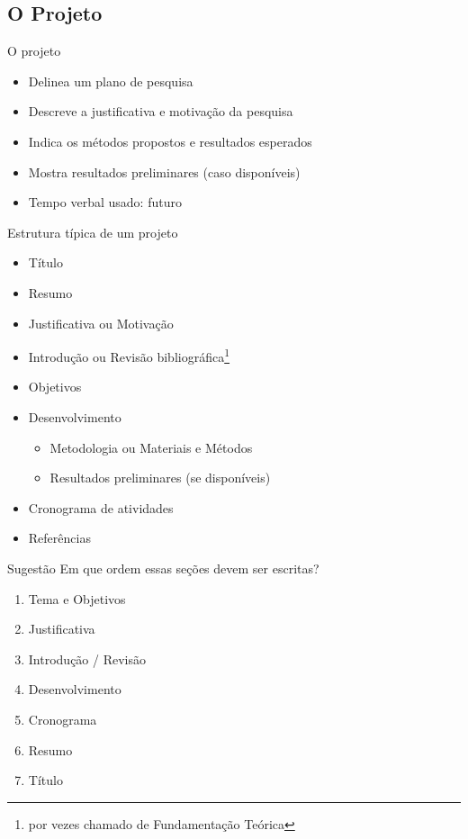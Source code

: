 \documentclass{beamer}
\begin{document}
\subsection{O Projeto}

\begin{frame}{O projeto}
  \begin{itemize}
  \item Delinea um \alert{plano} de pesquisa
  \item Descreve a justificativa e motivação da pesquisa
  \item Indica os métodos propostos e resultados esperados
  \item Mostra resultados preliminares (caso disponíveis)
  \item Tempo verbal usado: \alert{futuro}
  \end{itemize}
\end{frame}

\begin{frame}{Estrutura típica de um projeto}
  \begin{itemize}
  \item Título
  \item Resumo
  \item Justificativa ou Motivação
  \item Introdução ou Revisão bibliográfica\footnote{por vezes chamado
      de Fundamentação Teórica}
  \item Objetivos
  \item Desenvolvimento
    \begin{itemize}
    \item Metodologia ou Materiais e Métodos
    \item Resultados preliminares (se disponíveis)
    \end{itemize}
  \item Cronograma de atividades
  \item Referências
  \end{itemize}
\end{frame}

\begin{frame}{Sugestão}
Em que ordem essas seções devem ser escritas?
\begin{enumerate}
\item Tema e Objetivos
\item Justificativa
\item Introdução / Revisão
\item Desenvolvimento
\item Cronograma
\item Resumo
\item Título
\end{enumerate}
\end{frame}
\end{document}
